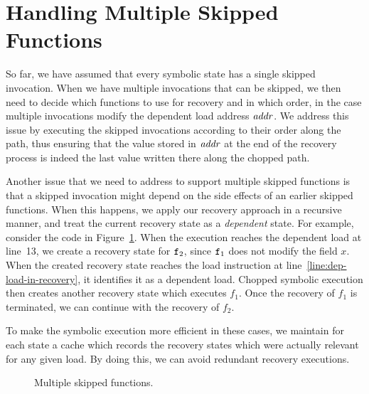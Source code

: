 
\section{Handling Multiple Skipped Functions}
\label{Se:SkipMultipleFuncs}
So far, we have assumed that every symbolic state has a single skipped
invocation. When we have multiple invocations that can be skipped, we
then need to decide which functions to use for recovery and in which
order, in the case multiple invocations modify the dependent load
address $\mathit{addr}$. We address this issue by executing the skipped
invocations according to their order along the path, thus ensuring
that the value stored in $\mathit{addr}$ at the end of the recovery process is
indeed the last value written there along the chopped path.

Another issue that we need to address to support multiple skipped
functions is that a skipped invocation might depend on the side
effects of an earlier skipped functions. When this happens, we apply
our recovery approach in a recursive manner, and treat the current
recovery state as a \emph{dependent} state. For example, consider the
code in Figure~\ref{fig:multiple-skipped-functions}. When the
execution reaches the dependent load at line~13, we create a recovery
state for $\texttt{f}_2$, since $\texttt{f}_1$ does not modify the field
$x$.  When the created recovery state reaches the load instruction at
line~\ref{line:dep-load-in-recovery}, it identifies it as a dependent load. Chopped symbolic
execution then creates another recovery state which executes $f_1$.
Once the recovery of $f_1$ is terminated, we can continue with the
recovery of $f_2$.

To make the symbolic execution more efficient in these cases, we
maintain for each state a cache which records the recovery states
which were actually relevant for any given load. By doing this, we can
avoid redundant recovery executions.

\begin{figure}[tbp]

\caption{Multiple skipped functions.}\vspace{-5mm}
\label{fig:multiple-skipped-functions}
\end{figure}

